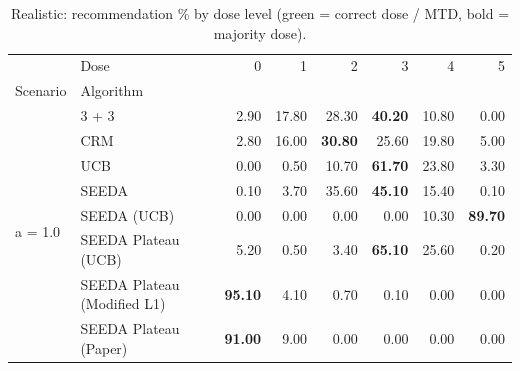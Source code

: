 \begin{table}[H]
\centering
\caption{Realistic: recommendation \% by dose level (green = correct dose / MTD, bold = majority dose).}
\label{tab:real_rec_by_dose}
\begin{tabular}{llrrrrrr}
\toprule
 & Dose & 0 & 1 & 2 & 3 & 4 & 5 \\
Scenario & Algorithm &  &  &  &  &  &  \\
\midrule
\multirow[c]{8}{*}{a = 1.0} & 3 + 3 & 2.90 & 17.80 & {\cellcolor[HTML]{C8E6C9}} 28.30 & \bfseries 40.20 & 10.80 & 0.00 \\
 & CRM & 2.80 & 16.00 & {\cellcolor[HTML]{C8E6C9}} \bfseries 30.80 & 25.60 & 19.80 & 5.00 \\
 & UCB & 0.00 & 0.50 & {\cellcolor[HTML]{C8E6C9}} 10.70 & \bfseries 61.70 & 23.80 & 3.30 \\
 & SEEDA & 0.10 & 3.70 & {\cellcolor[HTML]{C8E6C9}} 35.60 & \bfseries 45.10 & 15.40 & 0.10 \\
 & SEEDA (UCB) & 0.00 & 0.00 & {\cellcolor[HTML]{C8E6C9}} 0.00 & 0.00 & 10.30 & \bfseries 89.70 \\
 & SEEDA Plateau (UCB) & 5.20 & 0.50 & {\cellcolor[HTML]{C8E6C9}} 3.40 & \bfseries 65.10 & 25.60 & 0.20 \\
 & SEEDA Plateau (Modified L1) & \bfseries 95.10 & 4.10 & {\cellcolor[HTML]{C8E6C9}} 0.70 & 0.10 & 0.00 & 0.00 \\
 & SEEDA Plateau (Paper) & \bfseries 91.00 & 9.00 & {\cellcolor[HTML]{C8E6C9}} 0.00 & 0.00 & 0.00 & 0.00 \\
\bottomrule
\end{tabular}
\end{table}
